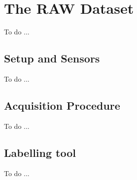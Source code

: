 \chapter{The RAW Dataset}\label{ch:benchmarks_and_metrics}
To do ...

\section{Setup and Sensors}\label{sec:raw_setup_and_sensors}
To do ...

\section{Acquisition Procedure}\label{sec:raw_acquisition_procedure}
To do ...

\section{Labelling tool}\label{sec:raw_labeltool}
To do ...